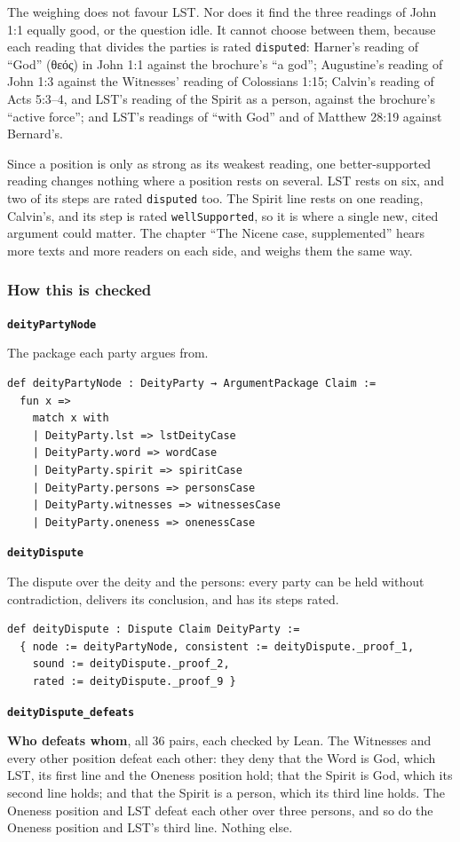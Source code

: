 \documentclass[11pt,paper=\testimonypaper,DIV=13,parskip=false]{scrartcl}
\begin{document}
The weighing does not favour LST. Nor does it find the three readings of John 1:1 equally good, or the question idle. It cannot choose between them, because each reading that divides the parties is rated \texttt{disputed}: Harner’s reading of “God” (θεός) in John 1:1 against the brochure’s “a god”; Augustine’s reading of John 1:3 against the Witnesses’ reading of Colossians 1:15; Calvin’s reading of Acts 5:3–4, and LST’s reading of the Spirit as a person, against the brochure’s “active force”; and LST’s readings of “with God” and of Matthew 28:19 against Bernard’s.

Since a position is only as strong as its weakest reading, one better-supported reading changes nothing where a position rests on several. LST rests on six, and two of its steps are rated \texttt{disputed} too. The Spirit line rests on one reading, Calvin’s, and its step is rated \texttt{well\allowbreak{}Supported}, so it is where a single new, cited argument could matter. The chapter “The Nicene case, supplemented” hears more texts and more readers on each side, and weighs them the same way.

\subsubsection*{How this is checked}
\par\medskip\noindent\textbf{\texttt{deity\allowbreak{}Party\allowbreak{}Node}}\par\nobreak\noindent
The package each party argues from.

{\small\begin{verbatim}
def deityPartyNode : DeityParty → ArgumentPackage Claim :=
  fun x =>
    match x with
    | DeityParty.lst => lstDeityCase
    | DeityParty.word => wordCase
    | DeityParty.spirit => spiritCase
    | DeityParty.persons => personsCase
    | DeityParty.witnesses => witnessesCase
    | DeityParty.oneness => onenessCase
\end{verbatim}}
\par\medskip\noindent\textbf{\texttt{deity\allowbreak{}Dispute}}\par\nobreak\noindent
The dispute over the deity and the persons: every party can be held without contradiction, delivers its conclusion, and has its steps rated.

{\small\begin{verbatim}
def deityDispute : Dispute Claim DeityParty :=
  { node := deityPartyNode, consistent := deityDispute._proof_1,
    sound := deityDispute._proof_2,
    rated := deityDispute._proof_9 }
\end{verbatim}}
\par\medskip\noindent\textbf{\texttt{deity\allowbreak{}Dispute\_\allowbreak{}defeats}}\par\nobreak\noindent
\textbf{Who defeats whom}, all 36 pairs, each checked by Lean. The Witnesses and every other position defeat each other: they deny that the Word is God, which LST, its first line and the Oneness position hold; that the Spirit is God, which its second line holds; and that the Spirit is a person, which its third line holds. The Oneness position and LST defeat each other over three persons, and so do the Oneness position and LST’s third line. Nothing else.
\end{document}
